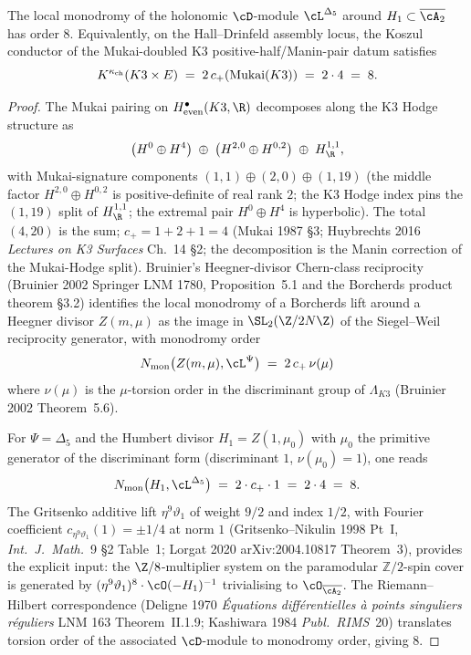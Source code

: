 \begin{theorem}
\label{gluing:thm:humbert-order-8}
The local monodromy of the holonomic $\cD$-module $\cL^{\Delta_5}$
around $H_1 \subset \overline{\cA_2}$ has order $8$. Equivalently, on
the Hall--Drinfeld assembly locus, the Koszul conductor of
the Mukai-doubled K3 positive-half/Manin-pair datum satisfies
\[
 K^{\kappa_{\mathrm{ch}}}(K3 \times E) \;=\; 2\, c_+(\mathrm{Mukai}(K3))
 \;=\; 2 \cdot 4 \;=\; 8.
\]
\end{theorem}

\begin{proof}
The Mukai pairing on $H^\bullet_{\mathrm{even}}(K3, \R)$ decomposes
along the K3 Hodge structure as
\[
 \bigl(H^0 \oplus H^4\bigr) \;\oplus\; \bigl(H^{2, 0} \oplus H^{0, 2}\bigr)
 \;\oplus\; H^{1, 1}_{\R},
\]
with Mukai-signature components $(1, 1) \oplus (2, 0) \oplus (1, 19)$
(the middle factor $H^{2, 0} \oplus H^{0, 2}$ is positive-definite of
real rank $2$; the K3 Hodge index pins the $(1, 19)$ split of
$H^{1, 1}_{\R}$; the extremal pair $H^0 \oplus H^4$ is hyperbolic).
The total $(4, 20)$ is the sum; $c_+ = 1 + 2 + 1 = 4$ (Mukai 1987
\S 3; Huybrechts 2016 \emph{Lectures on K3 Surfaces} Ch.~14 \S 2;
the decomposition is the Manin correction of the Mukai-Hodge split).
Bruinier's
Heegner-divisor Chern-class reciprocity (Bruinier 2002 Springer
LNM 1780, Proposition~5.1 and the Borcherds product theorem \S 3.2)
identifies the local monodromy of a Borcherds lift around a Heegner
divisor $Z(m, \mu)$ as the image in $\SL_2(\Z / 2N\Z)$ of the
Siegel--Weil reciprocity generator, with monodromy order
\[
 N_{\mathrm{mon}}\bigl(Z(m,\mu),\cL^\Psi\bigr) \;=\; 2\, c_+\, \nu(\mu)
\]
where $\nu(\mu)$ is the $\mu$-torsion order in the discriminant
group of $\Lambda_{K3}$ (Bruinier 2002 Theorem~5.6).

For $\Psi = \Delta_5$ and the Humbert divisor $H_1 = Z(1, \mu_0)$
with $\mu_0$ the primitive generator of the discriminant form
(discriminant $1$, $\nu(\mu_0) = 1$), one reads
\[
 N_{\mathrm{mon}}\bigl(H_1,\cL^{\Delta_5}\bigr) \;=\; 2 \cdot c_+ \cdot 1
 \;=\; 2 \cdot 4 \;=\; 8.
\]
The Gritsenko additive lift $\eta^9 \vartheta_1$ of weight $9/2$ and
index $1/2$, with Fourier coefficient $c_{\eta^9 \vartheta_1}(1) =
\pm 1/4$ at norm $1$ (Gritsenko--Nikulin 1998 Pt~I,
\emph{Int.\ J.\ Math.}~9 \S 2 Table~1; Lorgat 2020
arXiv:2004.10817 Theorem~3), provides the explicit input:
the $\Z/8$-multiplier system on the paramodular $\mathbb{Z}/2$-spin
cover is generated by $(\eta^9 \vartheta_1)^8 \cdot \cO(-H_1)^{-1}$
trivialising to $\cO_{\overline{\cA_2}}$. The Riemann--Hilbert
correspondence (Deligne 1970 \emph{\'Equations diff\'erentielles
\`a points singuliers r\'eguliers} LNM 163 Theorem~II.1.9;
Kashiwara 1984 \emph{Publ.\ RIMS}~20) translates torsion order of
the associated $\cD$-module to monodromy order, giving $8$.
\end{proof}

